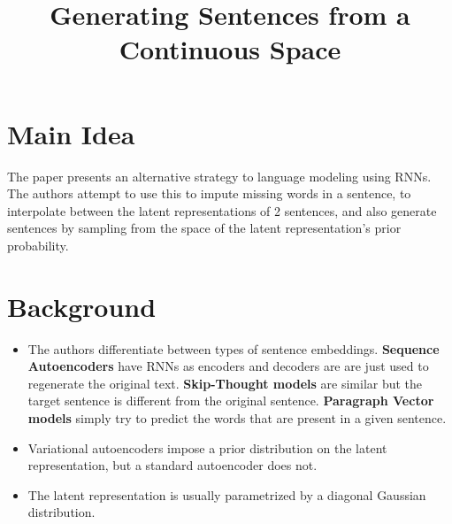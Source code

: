 \documentclass[12pt]{scrartcl}
\begin{document}
\title{Generating Sentences from a Continuous Space}
\author{}
\date{}
\maketitle

\section{Main Idea}
  The paper presents an alternative strategy to language modeling using RNNs. The authors attempt to use this to impute missing words in a sentence, to interpolate between the latent representations of 2 sentences, and also generate sentences by sampling from the space of the latent representation's prior probability. \cite{bowman2016generating}

\section{Background}
  \begin{itemize}
    \item The authors differentiate between types of sentence embeddings. \textbf{Sequence Autoencoders} have RNNs as encoders and decoders are are just used to regenerate the original text. \textbf{Skip-Thought models} are similar but the target sentence is different from the original sentence. \textbf{Paragraph Vector models} simply try to predict the words that are present in a given sentence.
    \item Variational autoencoders impose a prior distribution on the latent representation, but a standard autoencoder does not.
    \item The latent representation is usually parametrized by a diagonal Gaussian distribution.
  \end{itemize}
\end{document}
